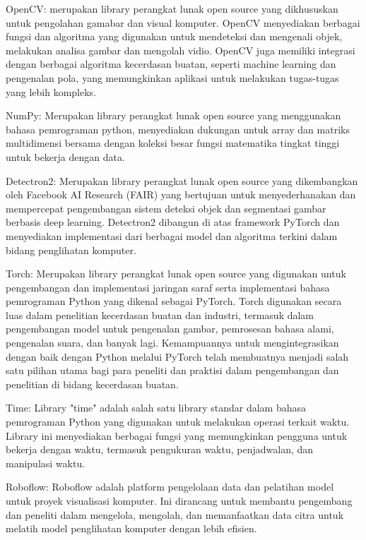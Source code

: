 \begin{packed_enum}
	\item OpenCV: merupakan library perangkat lunak open source yang dikhususkan untuk pengolahan gamabar dan visual komputer. OpenCV menyediakan berbagai fungsi dan algoritma yang digunakan untuk mendeteksi dan mengenali objek, melakukan analisa gambar dan mengolah vidio. OpenCV juga memiliki integrasi dengan berbagai algoritma kecerdasan buatan, seperti machine learning dan pengenalan pola, yang memungkinkan aplikasi untuk melakukan tugas-tugas yang lebih kompleks.
	\item NumPy: Merupakan library perangkat lunak open source yang menggunakan bahasa pemrograman python, menyediakan dukungan untuk array dan matriks multidimensi bersama dengan koleksi besar fungsi matematika tingkat tinggi untuk bekerja dengan data. 
	\item Detectron2: Merupakan library perangkat lunak open source  yang dikembangkan oleh Facebook AI Research (FAIR) yang bertujuan untuk menyederhanakan dan mempercepat pengembangan sistem deteksi objek dan segmentasi gambar berbasis deep learning. Detectron2 dibangun di atas framework PyTorch dan menyediakan implementasi dari berbagai model dan algoritma terkini dalam bidang penglihatan komputer.
	\item Torch: Merupakan library perangkat lunak open source  yang digunakan untuk pengembangan dan implementasi jaringan saraf serta implementasi bahasa pemrograman Python yang dikenal sebagai PyTorch. Torch digunakan secara luas dalam penelitian kecerdasan buatan dan industri, termasuk dalam pengembangan model untuk pengenalan gambar, pemrosesan bahasa alami, pengenalan suara, dan banyak lagi. Kemampuannya untuk mengintegrasikan dengan baik dengan Python melalui PyTorch telah membuatnya menjadi salah satu pilihan utama bagi para peneliti dan praktisi dalam pengembangan dan penelitian di bidang kecerdasan buatan.
	\item Time: Library "time" adalah salah satu library standar dalam bahasa pemrograman Python yang digunakan untuk melakukan operasi terkait waktu. Library ini menyediakan berbagai fungsi yang memungkinkan pengguna untuk bekerja dengan waktu, termasuk pengukuran waktu, penjadwalan, dan manipulasi waktu.
	\item Roboflow: Roboflow adalah platform pengelolaan data dan pelatihan model untuk proyek visualisasi komputer. Ini dirancang untuk membantu pengembang dan peneliti dalam mengelola, mengolah, dan memanfaatkan data citra untuk melatih model penglihatan komputer dengan lebih efisien. 
\end{packed_enum}

